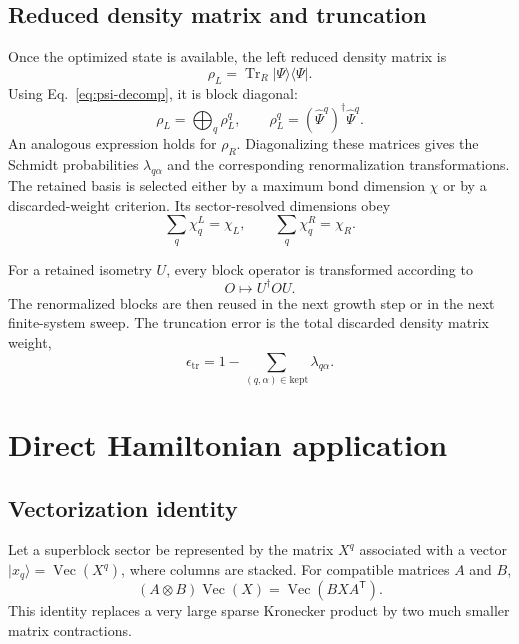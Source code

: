 \documentclass[11pt,a4paper]{article}
\newcommand{\ket}[1]{\lvert #1\rangle}
\newcommand{\bra}[1]{\langle #1\rvert}
\newcommand{\Tr}{\operatorname{Tr}}
\newcommand{\OpVec}{\operatorname{Vec}}
\begin{document}
\subsection{Reduced density matrix and truncation}

Once the optimized state is available, the left reduced density matrix is
\begin{equation}
  \rho_L=\Tr_R\ket{\Psi}\bra{\Psi}.
\end{equation}
Using Eq.~\eqref{eq:psi-decomp}, it is block diagonal:
\begin{equation}
  \rho_L=\bigoplus_q\rho_L^q,
  \qquad
  \rho_L^q=(\widehat\Psi^q)^\dagger\widehat\Psi^q.
  \label{eq:rdm}
\end{equation}
An analogous expression holds for $\rho_R$.  Diagonalizing these matrices
gives the Schmidt probabilities $\lambda_{q\alpha}$ and the corresponding
renormalization transformations.  The retained basis is selected either by a
maximum bond dimension $\chi$ or by a discarded-weight criterion.  Its
sector-resolved dimensions obey
\begin{equation}
  \sum_q\chi_q^{L}=\chi_L,
  \qquad
  \sum_q\chi_q^{R}=\chi_R.
\end{equation}

For a retained isometry $U$, every block operator is transformed according to
\begin{equation}
  O\longmapsto U^\dagger O U.
\end{equation}
The renormalized blocks are then reused in the next growth step or in the next
finite-system sweep.  The truncation error is the total discarded density
matrix weight,
\begin{equation}
  \epsilon_{\mathrm{tr}}
  =1-\sum_{(q,\alpha)\in\mathrm{kept}}\lambda_{q\alpha}.
\end{equation}

\section{Direct Hamiltonian application}

\subsection{Vectorization identity}

Let a superblock sector be represented by the matrix $X^q$ associated with a
vector $\ket{x_q}=\OpVec(X^q)$, where columns are stacked.  For compatible
matrices $A$ and $B$,
\begin{equation}
  (A\otimes B)\OpVec(X)=\OpVec(BXA^{\mathsf T}).
  \label{eq:vec-identity}
\end{equation}
This identity replaces a very large sparse Kronecker product by two much
smaller matrix contractions.
\end{document}

